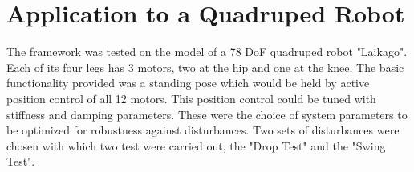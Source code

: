 






    
    








    


    




\section{Application to a Quadruped Robot} \label{app}
    
    The framework was tested on the model of a 78 DoF quadruped robot "Laikago". Each of its four legs has 3 motors, two at the hip and one at the knee. The basic functionality provided was a standing pose which would be held by active position control of all 12 motors. This position control could be tuned with stiffness and damping parameters. These were the choice of system parameters to be optimized for robustness against disturbances. Two sets of disturbances were chosen with which two test were carried out, the "Drop Test" and the "Swing Test". 

